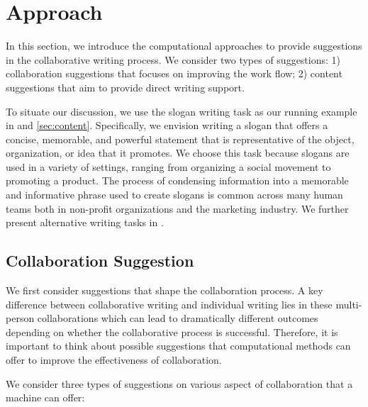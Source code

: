 
\section{Approach}


In this section, we introduce the computational approaches to provide suggestions in the collaborative writing process.
We consider two types of suggestions: 1) collaboration suggestions that focuses on improving the work flow;
2) content suggestions that aim to provide direct writing support.

To situate our discussion, we use the slogan writing task as our running example in  and \ref{sec:content}.
Specifically, we envision writing a slogan that offers a concise, memorable,
and powerful statement that is representative of the object,
organization, or idea that it promotes.
We choose this task because slogans are used in a variety of settings, ranging
from organizing a social movement to promoting a product.
The process of condensing information into a memorable and
informative phrase used to create slogans is common across many human teams both in non-profit organizations and the marketing industry.
We further present alternative writing tasks in .


\subsection{Collaboration Suggestion}
\label{sec:workflow}

We first consider suggestions that shape the collaboration process.
A key difference between collaborative writing and individual writing lies in these multi-person collaborations which can lead to dramatically different outcomes
depending on whether the collaborative process is successful.
Therefore, it is important to think about possible suggestions that computational methods can offer to improve the effectiveness of collaboration.

We consider three types of suggestions on various aspect of collaboration that a machine can offer:


